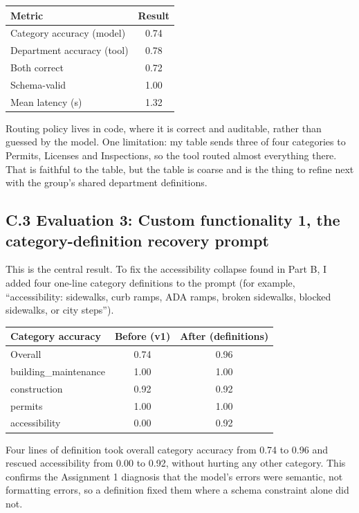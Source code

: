\documentclass[11pt]{article}
\begin{document}
\begin{center}
\small
\begin{tabularx}{\textwidth}{X c}
\toprule
\textbf{Metric} & \textbf{Result} \\
\midrule
Category accuracy (model) & 0.74 \\
Department accuracy (tool) & 0.78 \\
Both correct & 0.72 \\
Schema-valid & 1.00 \\
Mean latency (s) & 1.32 \\
\bottomrule
\end{tabularx}
\end{center}

Routing policy lives in code, where it is correct and auditable, rather than guessed by the model. One limitation: my table sends three of four categories to Permits, Licenses and Inspections, so the tool routed almost everything there. That is faithful to the table, but the table is coarse and is the thing to refine next with the group's shared department definitions.

\subsection*{C.3 Evaluation 3: Custom functionality 1, the category-definition recovery prompt}
This is the central result. To fix the accessibility collapse found in Part B, I added four one-line category definitions to the prompt (for example, ``accessibility: sidewalks, curb ramps, ADA ramps, broken sidewalks, blocked sidewalks, or city steps'').

\begin{center}
\small
\begin{tabularx}{\textwidth}{X c c}
\toprule
\textbf{Category accuracy} & \textbf{Before (v1)} & \textbf{After (definitions)} \\
\midrule
Overall & 0.74 & 0.96 \\
building\_maintenance & 1.00 & 1.00 \\
construction & 0.92 & 0.92 \\
permits & 1.00 & 1.00 \\
accessibility & 0.00 & 0.92 \\
\bottomrule
\end{tabularx}
\end{center}

Four lines of definition took overall category accuracy from 0.74 to 0.96 and rescued accessibility from 0.00 to 0.92, without hurting any other category. This confirms the Assignment 1 diagnosis that the model's errors were semantic, not formatting errors, so a definition fixed them where a schema constraint alone did not.
\end{document}

